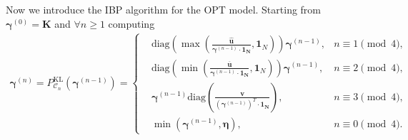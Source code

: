 \documentclass[review,hidelinks,onefignum,onetabnum]{siamart220329}
\begin{document}
Now we introduce the IBP algorithm for the OPT model.
Starting from $\bm{\gamma}^{(0)}=\bm{K}$ and $\forall n \geq 1$ computing 
\begin{align*}
\bm{\gamma}^{(n)}=P_{\mathcal{C}_{n}}^{\mathrm{KL}}(\bm{\gamma}^{(n-1)})=
\left\{
\begin{aligned}
&\mathrm{diag} \left(\max \left(\frac{\bm{\hat{u}}}{\bm{\gamma}^{(n-1)}\cdot \bm{1_{N}}},\bm{1}_N\right)\right) \bm{\gamma}^{(n-1)},
&n \equiv 1\pmod{4},\\
&\mathrm{diag} \left(\min \left(\frac{\bm{\overline{u}}}{\bm{\gamma}^{(n-1)}\cdot \bm{1_{N}}},\bm{1}_N\right)\right) \bm{\gamma}^{(n-1)},
&n \equiv 2\pmod{4},\\
&\bm{\gamma}^{(n-1)} \mathrm{diag} \left(\frac{\bm{v}}{(\bm{\gamma}^{(n-1)})^T \cdot \bm{1_{N}}}\right),
&n \equiv 3\pmod{4},\\
&\min(\bm{\gamma}^{(n-1)},\bm{\eta}),
&n \equiv 0\pmod{4}.
\end{aligned}
\right.
\end{align*}
\end{document}
